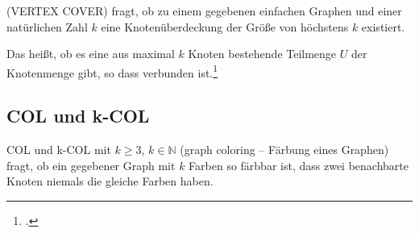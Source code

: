 \documentclass{lehramt-informatik-haupt}
\begin{document}
(VERTEX COVER) fragt, ob zu einem gegebenen einfachen Graphen und einer
natürlichen Zahl $k$ eine Knotenüberdeckung der Größe von höchstens $k$
existiert.

Das heißt, ob es eine aus maximal $k$ Knoten bestehende Teilmenge $U$
der Knotenmenge gibt, so dass  verbunden ist.\footcite[Seite
78]{theo:fs:4}

%

\subsection{COL und k-COL}

COL und k-COL mit $k \geq 3$, $k \in \mathbb{N}$ (graph coloring –
Färbung eines Graphen) fragt, ob ein gegebener Graph mit $k$ Farben so
färbbar ist, dass zwei benachbarte Knoten niemals die gleiche Farben
haben.

\literatur
\end{document}
